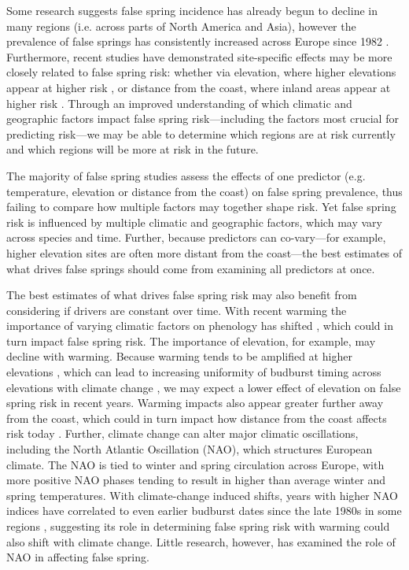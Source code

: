 \documentclass{article}\usepackage[]{graphicx}\usepackage[]{color}
\begin{document}
Some research suggests false spring incidence has already begun to decline in many regions (i.e. across parts of North America and Asia), however the prevalence of false springs has consistently increased across Europe since 1982 \citep{Liu2018}. Furthermore, recent studies have demonstrated site-specific effects may be more closely related to false spring risk: whether via elevation, where higher elevations appear at higher risk \citep{Ma2018, Vitasse2018, Vitra2017}, or distance from the coast, where inland areas appear at higher risk \citep{Ma2018,Wypych2016a}. Through an improved understanding of which climatic and geographic factors impact false spring risk---including the factors most crucial for predicting risk---we may be able to determine which regions are at risk currently and which regions will be more at risk in the future.

The majority of false spring studies assess the effects of one predictor (e.g. temperature, elevation or distance from the coast) on false spring prevalence, thus failing to compare how multiple factors may together shape risk. Yet false spring risk is influenced by multiple climatic and geographic factors, which may vary across species and time. Further, because predictors can co-vary---for example, higher elevation sites are often more distant from the coast---the best estimates of what drives false springs should come from examining all predictors at once. 

The best estimates of what drives false spring risk may also benefit from considering if drivers are constant over time. With recent warming the importance of varying climatic factors on phenology has shifted \citep[e.g.,][]{Cook2016,Gauzere2019}, which could in turn impact false spring risk. The importance of elevation, for example, may decline with warming. Because warming tends to be amplified at higher elevations \citep{Pepin2015, Rangwala2012, Giorgi1997}, which can lead to increasing uniformity of budburst timing across elevations with climate change \citep{Vitasse2018}, we may expect a lower effect of elevation on false spring risk in recent years. Warming impacts also appear greater further away from the coast, which could in turn impact how distance from the coast affects risk today \citep{Ma2018, Wypych2016a}. Further, climate change can alter major climatic oscillations, including the North Atlantic Oscillation (NAO), which structures European climate. The NAO  is tied to winter and spring circulation across Europe, with more positive NAO phases tending to result in higher than average winter and spring temperatures. With climate-change induced shifts, years with higher NAO indices have correlated to even earlier budburst dates since the late 1980s in some regions \citep{Chmielewski2001}, suggesting its role in determining false spring risk with warming could also shift with climate change. Little research, however, has examined the role of NAO in affecting false spring. 
\end{document}
